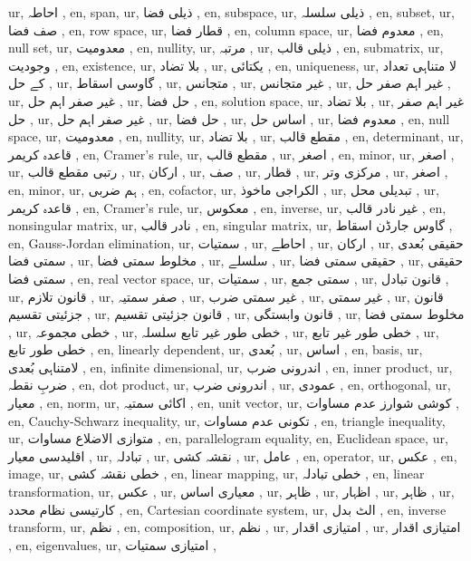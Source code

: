 ur, احاطہ ,
en, span,
ur, ذیلی فضا ,
en, subspace,
ur, ذیلی سلسلہ ,
en, subset,
ur, صف فضا ,
en, row space,
ur, قطار فضا ,
en, column space,
ur, معدوم فضا ,
en, null set,
ur, معدومیت ,
en, nullity,
ur, مرتبہ ,
ur, ذیلی قالب ,
en, submatrix,
ur, وجودیت ,
en, existence,
ur, بلا تضاد ,
ur, یکتائی ,
en, uniqueness,
ur, لا متناہی تعداد کے حل ,
ur, گاوسی اسقاط ,
ur, متجانس ,
ur, غیر متجانس ,
ur, غیر اہم صفر حل ,
ur, غیر صفر اہم حل ,
ur, حل فضا ,
en, solution space,
ur, بلا تضاد ,
ur, غیر اہم صفر حل ,
ur, غیر صفر اہم حل ,
ur, حل فضا ,
ur, اساس حل ,
ur, معدوم فضا ,
en, null space,
ur, معدومیت ,
en, nullity,
ur, بلا تضاد ,
ur, مقطع قالب ,
en, determinant,
ur, قاعدہ کریمر ,
en, Cramer's rule,
ur, مقطع قالب ,
ur, اصغر ,
en, minor,
ur, اصغر ,
ur,  رتبی مقطع قالب ,
ur, ارکان ,
ur, صف ,
ur, قطار ,
ur, مرکزی وتر ,
ur, اصغر ,
en, minor,
ur, ہم ضربی ,
en, cofactor,
ur, الکراجی ماخوذ ,
ur, تبدیلی محل ,
ur, قاعدہ کریمر ,
en, Cramer's rule,
ur, معکوس ,
en, inverse,
ur, غیر نادر قالب ,
en, nonsingular matrix,
ur, نادر قالب ,
en, singular matrix,
ur, گاوس جارڈن اسقاط ,
en, Gauss-Jordan elimination,
ur, سمتیات ,
ur, احاطے ,
ur, ارکان ,
ur, حقیقی  بُعدی سمتی فضا ,
ur, مخلوط سمتی فضا ,
ur, سلسلے ,
ur, حقیقی سمتی فضا ,
ur, حقیقی سمتی فضا ,
en, real vector space,
ur, سمتیات ,
ur, سمتی جمع ,
ur, قانون تبادل ,
ur, قانون تلازم ,
ur, صفر سمتیہ ,
ur, غیر سمتی ضرب ,
ur, غیر سمتی ,
ur, قانون جزئیتی تقسیم ,
ur, قانون جزئیتی تقسیم ,
ur, قانون وابستگی ,
ur, مخلوط سمتی فضا ,
ur, خطی مجموعہ ,
ur, خطی طور غیر تابع سلسلہ ,
ur, خطی طور غیر تابع ,
ur, خطی طور تابع ,
en, linearly dependent,
ur,  بُعدی ,
ur, اساس ,
en, basis,
ur, لامتناہی بُعدی ,
en, infinite dimensional,
ur, اندرونی ضرب ,
en, inner product,
ur, ضربِ نقطہ ,
en, dot product,
ur, اندرونی ضرب ,
ur, عمودی ,
en, orthogonal,
ur, معیار ,
en, norm,
ur, اکائی سمتیہ ,
en, unit vector,
ur, کوشی شوارز عدم مساوات ,
en, Cauchy-Schwarz inequality,
ur, تکونی عدم مساوات ,
en, triangle inequality,
ur, متوازی الاضلاع مساوات ,
en, parallelogram equality,
en, Euclidean space,
ur, اقلیدسی معیار ,
ur, تبادلہ ,
ur, نقشہ کشی ,
ur, عامل ,
en, operator,
ur, عکس ,
en, image,
ur, خطی نقشہ کشی ,
en, linear mapping,
ur, خطی تبادلہ ,
en, linear transformation,
ur, عکس ,
ur, معیاری اساس ,
ur, ظاہر ,
ur, اظہار ,
ur, ظاہر ,
ur, کارتیسی نظام محدد ,
en, Cartesian coordinate system,
ur, الٹ بدل ,
en, inverse transform,
ur, نظم ,
en, composition,
ur, نظم ,
ur, امتیازی اقدار ,
ur, امتیازی اقدار ,
en, eigenvalues,
ur, امتیازی سمتیات ,
